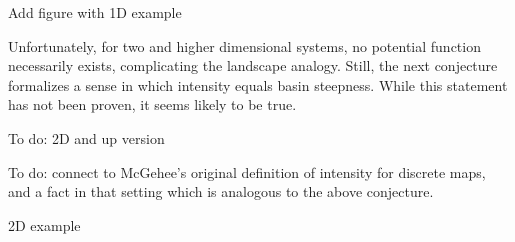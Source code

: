 Add figure with 1D example

Unfortunately, for two and higher dimensional systems, no potential function necessarily exists, complicating the landscape analogy. Still, the next conjecture formalizes a sense in which intensity equals basin steepness. While this statement has not been proven, it seems likely to be true.  

\begin{conjecture}
	To do: 2D and up version
\end{conjecture}

\begin{remark}
	To do: connect to McGehee's original definition of intensity for discrete maps, and a fact in that setting which is analogous to the above conjecture.
\end{remark}

2D example